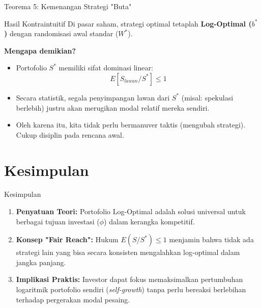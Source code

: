 \documentclass{beamer}
\begin{document}
\begin{frame}{Teorema 5: Kemenangan Strategi "Buta"}
    \begin{alertblock}{Hasil Kontraintuitif}
        Di pasar saham, strategi optimal tetaplah \textbf{Log-Optimal ($b^*$)} dengan randomisasi awal standar ($W^*$).
    \end{alertblock}
    
    \vspace{0.3cm}
    \textbf{Mengapa demikian?}
    \begin{itemize}
        \item Portofolio $S^*$ memiliki sifat dominasi linear:
        $$E[S_{lawan}/S^*] \le 1$$
        \item Secara statistik, segala penyimpangan lawan dari $S^*$ (misal: spekulasi berlebih) justru akan merugikan modal relatif mereka sendiri.
        \item Oleh karena itu, kita tidak perlu bermanuver taktis (mengubah strategi). Cukup disiplin pada rencana awal.
    \end{itemize}
\end{frame}

\section{Kesimpulan}

\begin{frame}{Kesimpulan}
    \begin{enumerate}
        \item \textbf{Penyatuan Teori:} 
        Portofolio Log-Optimal adalah solusi universal untuk berbagai tujuan investasi ($\phi$) dalam kerangka kompetitif.
        
        \item \textbf{Konsep "Fair Reach":} 
        Hukum $E(S/S^*) \le 1$ menjamin bahwa tidak ada strategi lain yang bisa secara konsisten mengalahkan log-optimal dalam jangka panjang.
        
        \item \textbf{Implikasi Praktis:} 
        Investor dapat fokus memaksimalkan pertumbuhan logaritmik portofolio sendiri (\textit{self-growth}) tanpa perlu bereaksi berlebihan terhadap pergerakan modal pesaing.
    \end{enumerate}
\end{frame}
\end{document}
